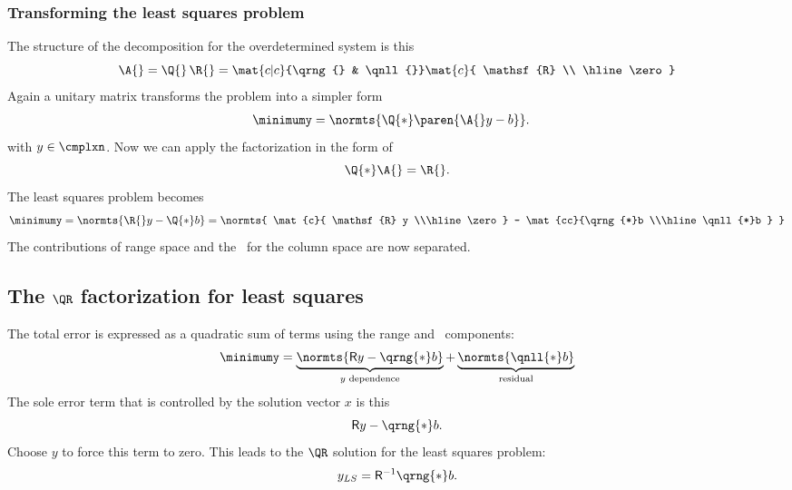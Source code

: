 \subsubsection{Transforming the least squares problem}
The structure of the decomposition for the overdetermined system is this
\begin{equation}
  \A{} 
    = \Q{}\, \R{}
    = \mat{c|c}{\qrng{} & \qnll{}} \mat{c}{ \mathsf{R} \\ \hline \zero}
\end{equation}
Again a unitary matrix transforms the problem into a simpler form
\begin{equation}
  \begin{split} 
    \minimumy 
      &= \normts{ \Q{*} \paren{ \A{} y - b }  }.
    \label{eq:qr min}
  \end{split} 
\end{equation}
with $y \in \cmplxn$.
Now we can apply the factorization in the form of
\begin{equation}
  \Q{*} \A{} = \R{}.
\end{equation}
The least squares problem becomes
\begin{equation}
  \begin{split} 
    \minimumy 
      = \normts{ \R{} y - \Q{*} b }
      &= \normts{ \mat{c}{ \mathsf{R} y \\\hline \zero} - \mat{cc}{\qrng{*}b \\\hline \qnll{*}b } } \\
  \end{split} 
\end{equation}
The contributions of range space and the \ns \ for the column space are now separated.


\subsection{The $\QR$ factorization for least squares}
The total error is expressed as a quadratic sum of terms using the range and \ns \ components:
\begin{equation}
  \minimumy = \underbrace{\normts{ \mathsf{R} y -\qrng{*} b  }}_{y \text{ dependence}} + \underbrace{\normts{ \qnll{*} b  }}_{\text{residual}}
\end{equation}
The sole error term that is controlled by the solution vector $x$ is this
\begin{equation*}
  \mathsf{R} y -\qrng{*} b .
\end{equation*}
Choose $y$ to force this term to zero. This leads to the $\QR$ solution for the least squares problem:
\begin{equation}
  y_{LS} = \mathsf{R}^{-1} \qrng{*} b.
  \label{eq:qr soln}
\end{equation}

